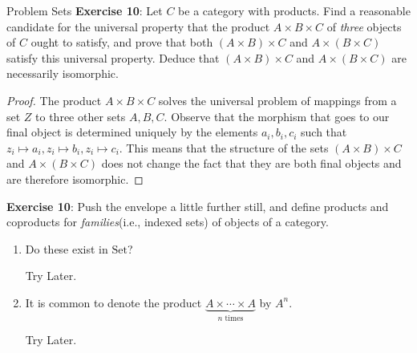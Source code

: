 \documentclass{report}
\begin{document}
\begin{exercises}{Problem Sets}
    \textbf{Exercise 10}: Let $C$ be a category with products. Find a reasonable candidate for the universal property that the product $A \times B \times C$ of \textit{three} objects of $C$ ought to satisfy, and prove that both $(A \times B) \times C$ and $A \times (B \times C)$ satisfy this universal property. Deduce that $(A \times B) \times C$ and $A \times (B \times C)$ are necessarily isomorphic.
        \begin{proof}
            The product $A \times B \times C$ solves the universal problem of mappings from a set $Z$ to three other sets $A, B, C$. Observe that the morphism that goes to our final object is determined uniquely by the elements $a_{i}, b_{i}, c_{i}$ such that $z_{i} \mapsto a_{i}, z_{i} \mapsto b_{i}, z_{i} \mapsto c_{i}$. This means that the structure of the sets $(A \times B) \times C$ and $A \times (B \times C)$ does not change the fact that they are both final objects and are therefore isomorphic.
        \end{proof}

    \textbf{Exercise 10}: Push the envelope a little further still, and define products and coproducts for \textit{families}(i.e., indexed sets) of objects of a category.
        \begin{enumerate}
            \item Do these exist in $\text{Set}$?
                \begin{answer}
                    Try Later.
                \end{answer}

            \item It is common to denote the product $\underbrace{A \times \cdots \times A}_{n \text{ times}}$ by $A^{n}$.
                \begin{answer}
                    Try Later.
                \end{answer}
        \end{enumerate}


\end{exercises}
\end{document}
